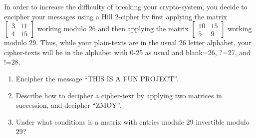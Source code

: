 \documentclass{../mathhomework}
\begin{document}
\begin{problem}
    In order to increase the difficulty of breaking your crypto-system, you decide to 
    encipher your messages using a Hill 2-cipher by first applying the matrix
    $\begin{bmatrix}
        3 & 11 \\ 4 & 15
    \end{bmatrix}$ 
    working modulo 26 and then applying the matrix
    $\begin{bmatrix}
        10 & 15 \\ 5 & 9
    \end{bmatrix}$
    working modulo 29. Thus, while your plain-texts are in the usual 26 letter alphabet, your cipher-texts will be in the alphabet with 0-25 as usual and blank=26, ?=27, and !=28.

    \begin{enumerate}[label=\alph*)]
        \item Encipher the message “THIS IS A FUN PROJECT”.
        \item Describe how to decipher a cipher-text by applying two matrices in succession, and decipher “ZMOY”.
        \item Under what conditions is a matrix with entries module 29 invertible modulo 29?
    \end{enumerate}
\end{problem}
\end{document}
